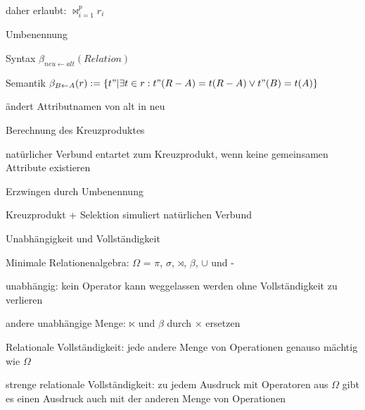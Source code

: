 \documentclass[a4paper]{article}
\begin{document}
\begin{multicols}{3}
\begin{itemize*}
\begin{itemize*}
        \item daher erlaubt: $\bowtie_{i=1}^p r_i$
    \end{itemize*}
    \item Umbenennung
    \begin{itemize*}
        \item Syntax $\beta_{neu\leftarrow alt} (Relation)$
        \item Semantik $\beta_{B\leftarrow A} (r) := \{t" | \exists t \in r : t" (R-A) = t(R-A) \vee t"(B) = t(A)\}$
        \item ändert Attributnamen von alt in neu
    \end{itemize*}
    \item Berechnung des Kreuzproduktes
    \begin{itemize*}
        \item natürlicher Verbund entartet zum Kreuzprodukt, wenn keine gemeinsamen Attribute existieren
        \item Erzwingen durch Umbenennung
        \item Kreuzprodukt + Selektion simuliert natürlichen Verbund
    \end{itemize*}
\end{itemize*}

Unabhängigkeit und Vollständigkeit
\begin{itemize*}
    \item Minimale Relationenalgebra: $\Omega$ = $\pi$, $\sigma$, $\rtimes$, $\beta$, $\cup$ und -
    \item unabhängig: kein Operator kann weggelassen werden ohne Vollständigkeit zu verlieren
    \item andere unabhängige Menge: $\ltimes$ und $\beta$ durch × ersetzen
    \item Relationale Vollständigkeit: jede andere Menge von Operationen genauso mächtig wie $\Omega$
    \item strenge relationale Vollständigkeit: zu jedem Ausdruck mit Operatoren aus $\Omega$ gibt es einen Ausdruck auch mit der anderen Menge von Operationen
\end{itemize*}


\end{multicols}
\end{document}
